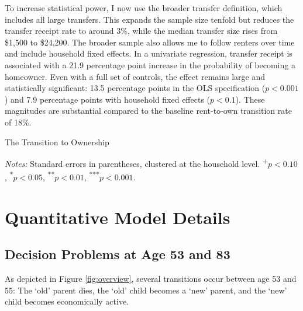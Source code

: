 \documentclass[12pt]{article}
\begin{document}
To increase statistical power, I now use the broader transfer definition, which includes all large transfers. This expands the sample size tenfold but reduces the transfer receipt rate to around 3\%, while the median transfer size rises from \$1,500 to \$24,200. The broader sample also allows me to follow renters over time and include household fixed effects. In a univariate regression, transfer receipt is associated with a 21.9 percentage point increase in the probability of becoming a homeowner. Even with a full set of controls, the effect remains large and statistically significant: 13.5 percentage points in the OLS specification ($p<0.001$) and 7.9 percentage points with household fixed effects ($p<0.1$). These magnitudes are substantial compared to the baseline rent-to-own transition rate of 18\%.

\begin{table}
	\center
	\begin{threeparttable}
		\caption{The Transition to Ownership}
		\label{tab:newowners}
		\small 
				

		{\begin{footnotesize}\begin{flushleft}
		\textit{Notes:} Standard errors in parentheses, clustered at the household level. \textsuperscript{+}$p<0.10$, \textsuperscript{*}$p<0.05$, \textsuperscript{**}$p<0.01$, \textsuperscript{***}$p<0.001$.
		\end{flushleft}\end{footnotesize}}		
	\end{threeparttable}
\end{table}


\section{Quantitative Model Details} 

\subsection{Decision Problems at Age 53 and 83}\label{sec:decextra}
As depicted in Figure \ref{fig:overview}, several transitions occur between age 53 and 55: The `old' parent dies, the `old' child becomes a `new' parent, and the `new' child becomes economically active. 
\end{document}
